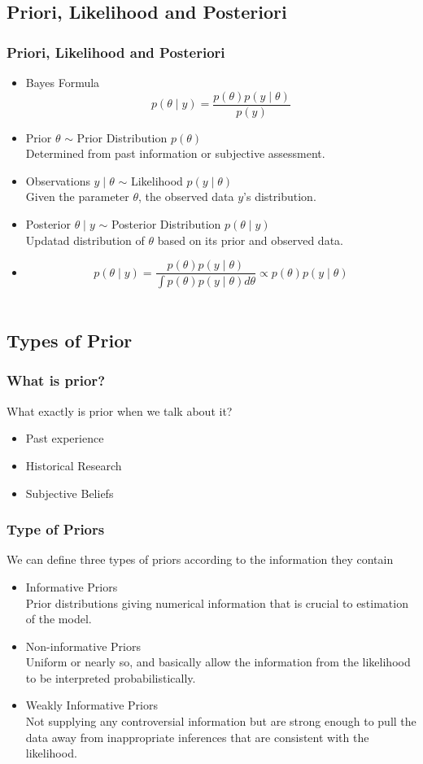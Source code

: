 \documentclass{beamer}
\begin{document}
\subsection{Priori, Likelihood and Posteriori}
\begin{frame}
\frametitle{Priori, Likelihood and Posteriori}
\begin{itemize}
\item Bayes Formula $$p(\theta\mid y) = \frac{p(\theta)p(y\mid\theta)}{p(y)}$$
\item Prior $\theta$ $\sim$ Prior Distribution $p(\theta)$ \\
Determined from past information or subjective assessment.
\item Observations $y\mid \theta$ $\sim$ Likelihood $p(y \mid \theta)$ \\
Given the parameter $\theta$, the observed data $y$'s distribution. 
\item Posterior $\theta \mid y$ $\sim$ Posterior Distribution $p(\theta \mid y)$ \\
Updatad distribution of $\theta$ based on its prior and observed data.
\item $$p(\theta \mid y) = \frac{p(\theta)p(y\mid \theta)}{\int p(\theta)p(y\mid \theta) d\theta} \propto p(\theta)p(y\mid \theta)$$ \\
\end{itemize}
\end{frame}

\subsection{Types of Prior}
\begin{frame}
\frametitle{What is prior?}
What exactly is prior when we talk about it?
\begin{itemize}
\item Past experience
\item Historical Research
\item Subjective Beliefs
\end{itemize}
\end{frame}

\begin{frame}
\frametitle{Type of Priors}
We can define three types of priors according to the information they contain
\begin{itemize}
\item Informative Priors \\
Prior distributions giving numerical information that is crucial to estimation of the model.
\item Non-informative Priors\\
Uniform or nearly so, and basically allow the information from the likelihood to be interpreted probabilistically.
\item Weakly Informative Priors\\
Not supplying any controversial information but are strong enough to pull the data away from inappropriate inferences that are consistent with the likelihood.
\end{itemize}
\end{frame}
\end{document}

